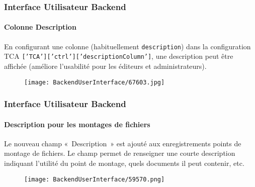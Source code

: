 \begin{frame}[fragile]
	\frametitle{Interface Utilisateur Backend}
	\framesubtitle{Colonne Description}

	En configurant une colonne (habituellement \texttt{description}) dans la configuration TCA
	\texttt{['TCA']['ctrl']['descriptionColumn']}, une description peut être affichée
	(améliore l'usabilité pour les éditeurs et administrateurs).

	\begin{figure}
		\texttt{[image: BackendUserInterface/67603.jpg]}
	\end{figure}

\end{frame}

\begin{frame}[fragile]
	\frametitle{Interface Utilisateur Backend}
	\framesubtitle{Description pour les montages de fichiers}

	Le nouveau champ «~Description~» est ajouté aux enregistrements points de montage de fichiers.
	Le champ permet de renseigner une courte description indiquant l'utilité du point de montage, quels
	documents il peut contenir, etc.

	\begin{figure}
		\texttt{[image: BackendUserInterface/59570.png]}
	\end{figure}

\end{frame}

